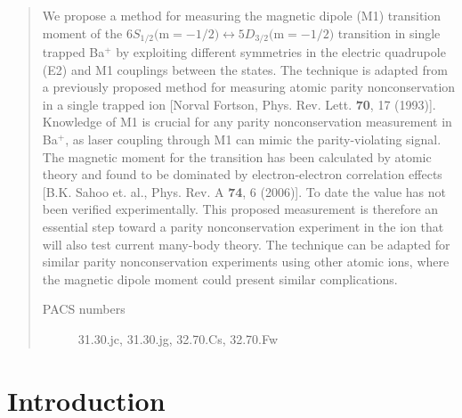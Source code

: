 \documentclass[%
 reprint,
 amsmath,amssymb,
 aps,
]{revtex4-1}
\begin{document}
\begin{abstract}
	    \noindent We propose a method for measuring the magnetic dipole (M1) transition moment of the $6S_{1/2} \big( \mathrm{m}=-1/2\big)\leftrightarrow 5D_{3/2}\big( \mathrm{m}=-1/2\big)$ transition in single trapped Ba$^{+}$ by exploiting different symmetries in the electric quadrupole (E2) and M1 couplings between the states.  The technique is adapted from a previously proposed method for measuring atomic parity nonconservation in a single trapped ion [Norval Fortson, Phys. Rev. Lett. \textbf{70}, 17 (1993)].  Knowledge of M1 is crucial for any parity nonconservation measurement in Ba$^{+}$, as laser coupling through M1 can mimic the parity-violating signal.  The magnetic moment for the transition has been calculated by atomic theory and found to be dominated by electron-electron correlation effects [B.K. Sahoo et. al., Phys. Rev. A \textbf{74}, 6 (2006)].  To date the value has not been verified experimentally.  This proposed measurement is therefore an essential step toward a parity nonconservation experiment in the ion that will also test current many-body theory.  The technique can be adapted for similar parity nonconservation experiments using other atomic ions, where the magnetic dipole moment could present similar complications.
	     
\begin{description}
\item[PACS numbers] 31.30.jc, 31.30.jg, 32.70.Cs, 32.70.Fw	
\end{description}
\end{abstract}

\maketitle

\section{Introduction}
\end{document}
